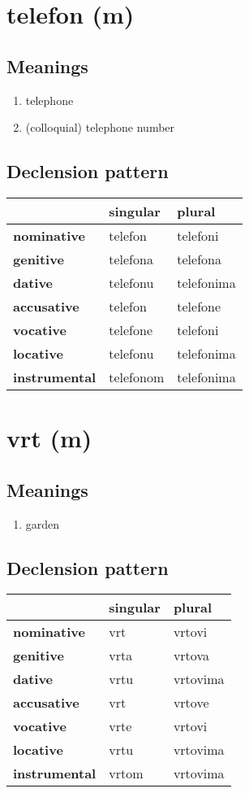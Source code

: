 \filbreak
\section{telefon (m)}
\subsection*{Meanings}
\begin{enumerate}
\item telephone
\item (colloquial) telephone number
\end{enumerate}
\subsection*{Declension pattern}
\begin{tabularx}{\linewidth}{Xll}
\toprule
{} &   singular &      plural \\
\midrule
\textbf{nominative  } &    telefon &    telefoni \\
\textbf{genitive    } &   telefona &    telefona \\
\textbf{dative      } &   telefonu &  telefonima \\
\textbf{accusative  } &    telefon &    telefone \\
\textbf{vocative    } &   telefone &    telefoni \\
\textbf{locative    } &   telefonu &  telefonima \\
\textbf{instrumental} &  telefonom &  telefonima \\
\bottomrule
\end{tabularx}

\filbreak
\section{vrt (m)}
\subsection*{Meanings}
\begin{enumerate}
\item garden
\end{enumerate}
\subsection*{Declension pattern}
\begin{tabularx}{\linewidth}{Xll}
\toprule
{} & singular &    plural \\
\midrule
\textbf{nominative  } &      vrt &   vrtovi \\
\textbf{genitive    } &    vrta &    vrtova \\
\textbf{dative      } &     vrtu &  vrtovima \\
\textbf{accusative  } &      vrt &    vrtove \\
\textbf{vocative    } &     vrte &    vrtovi \\
\textbf{locative    } &     vrtu &  vrtovima \\
\textbf{instrumental} &    vrtom &  vrtovima \\
\bottomrule
\end{tabularx}

